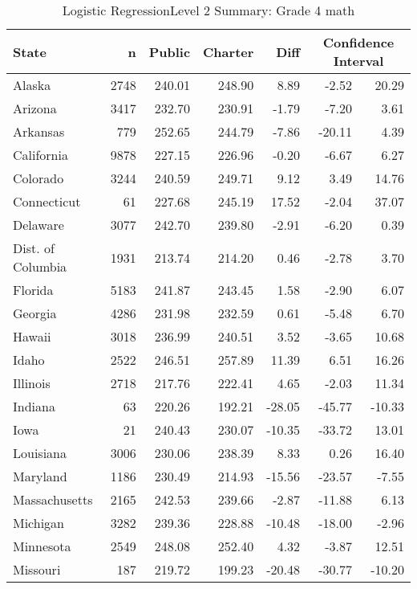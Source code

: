 \begin{table}[ht]
\begin{center}
\caption{Logistic RegressionLevel 2 Summary: Grade 4 math}
\label{g4mathlrlevel2}
\begin{tabular}{lrrrrrr}
  \hline
  State & n & Public & Charter & Diff & \multicolumn{2}{c}{Confidence Interval} \\ \hline
Alaska & 2748 & 240.01 & 248.90 & 8.89 & -2.52 & 20.29 \\ 
  Arizona & 3417 & 232.70 & 230.91 & -1.79 & -7.20 & 3.61 \\ 
  Arkansas & 779 & 252.65 & 244.79 & -7.86 & -20.11 & 4.39 \\ 
  California & 9878 & 227.15 & 226.96 & -0.20 & -6.67 & 6.27 \\ 
  Colorado & 3244 & 240.59 & 249.71 & 9.12 & 3.49 & 14.76 \\ 
  Connecticut &  61 & 227.68 & 245.19 & 17.52 & -2.04 & 37.07 \\ 
  Delaware & 3077 & 242.70 & 239.80 & -2.91 & -6.20 & 0.39 \\ 
  Dist. of Columbia & 1931 & 213.74 & 214.20 & 0.46 & -2.78 & 3.70 \\ 
  Florida & 5183 & 241.87 & 243.45 & 1.58 & -2.90 & 6.07 \\ 
  Georgia & 4286 & 231.98 & 232.59 & 0.61 & -5.48 & 6.70 \\ 
  Hawaii & 3018 & 236.99 & 240.51 & 3.52 & -3.65 & 10.68 \\ 
  Idaho & 2522 & 246.51 & 257.89 & 11.39 & 6.51 & 16.26 \\ 
  Illinois & 2718 & 217.76 & 222.41 & 4.65 & -2.03 & 11.34 \\ 
  Indiana &  63 & 220.26 & 192.21 & -28.05 & -45.77 & -10.33 \\ 
  Iowa &  21 & 240.43 & 230.07 & -10.35 & -33.72 & 13.01 \\ 
  Louisiana & 3006 & 230.06 & 238.39 & 8.33 & 0.26 & 16.40 \\ 
  Maryland & 1186 & 230.49 & 214.93 & -15.56 & -23.57 & -7.55 \\ 
  Massachusetts & 2165 & 242.53 & 239.66 & -2.87 & -11.88 & 6.13 \\ 
  Michigan & 3282 & 239.36 & 228.88 & -10.48 & -18.00 & -2.96 \\ 
  Minnesota & 2549 & 248.08 & 252.40 & 4.32 & -3.87 & 12.51 \\ 
  Missouri & 187 & 219.72 & 199.23 & -20.48 & -30.77 & -10.20 \\ 

\end{tabular}
\end{center}
\end{table}

